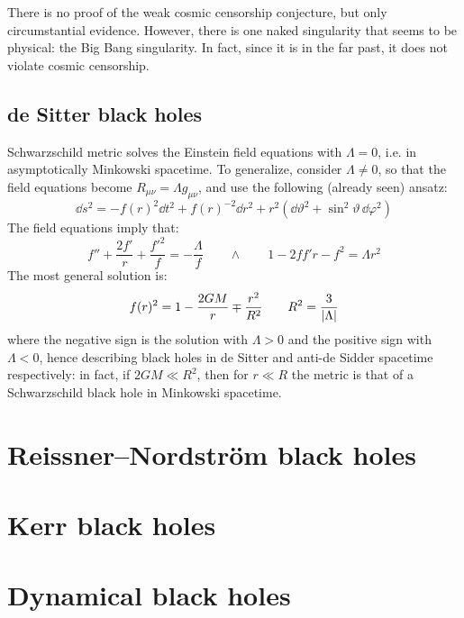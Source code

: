 There is no proof of the weak cosmic censorship conjecture, but only circumstantial evidence. However, there is one naked singularity that seems to be physical: the Big Bang singularity. In fact, since it is in the far past, it does not violate cosmic censorship.

\subsection{de Sitter black holes}

Schwarzschild metric  solves the Einstein field equations with $ \Lambda = 0 $, i.e. in asymptotically Minkowski spacetime. To generalize, consider $ \Lambda \neq 0 $, so that the field equations become $ R_{\mu \nu} = \Lambda g_{\mu \nu} $, and use the following (already seen) ansatz:
\begin{equation*}
  \dd s^2 = - f(r)^2 \dd t^2 + f(r)^{-2} \dd r^2 + r^2 \left( \dd \vartheta^2 + \sin^2 \vartheta \, \dd \varphi^2 \right)
\end{equation*}
The field equations imply that:
\begin{equation*}
  f'' + \frac{2f'}{r} + \frac{{f'}^2}{f} = - \frac{\Lambda}{f}
  \qquad \land \qquad
  1 - 2 f f' r - f^2 = \Lambda r^2
\end{equation*}
The most general solution is:
\begin{equation}
  f(r)^2 = 1 - \frac{2GM}{r} \mp \frac{r^2}{R^2}
  \qquad
  R^2 = \frac{3}{\left\lvert\Lambda\right\rvert}
  \label{eq:6.14}
\end{equation}
where the negative sign is the solution with $ \Lambda > 0 $ and the positive sign with $ \Lambda < 0 $, hence describing black holes in de Sitter and anti-de Sidder spacetime respectively: in fact, if $ 2GM \ll R^2 $, then for $ r \ll R $ the metric is that of a Schwarzschild black hole in Minkowski spacetime.

\section{Reissner--Nordström black holes}
\label{sec:bh-rn}

\section{Kerr black holes}
\label{sec:bh-kerr}

\section{Dynamical black holes}
\label{sec:bh-dynamics}










